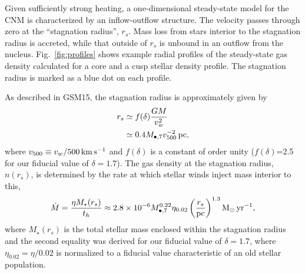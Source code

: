 \documentclass[usenatbib,fleqn]{mnras}
\newcommand{\Mbh}[1][]{M_{\bullet#1}}
\newcommand{\Msun}{{\rm M_\odot}}
\newcommand{\rs}{r_s}
\begin{document}
Given sufficiently strong heating, a one-dimensional steady-state
model for the CNM is characterized by an inflow-outflow structure.
The velocity passes through zero at the ``stagnation radius'', $\rs$.
Mass loss from stars interior to the stagnation radius is accreted,
while that outside of $\rs$ is unbound in an outflow from the nucleus.
Fig.~\ref{fig:profiles} shows example radial profiles of the
steady-state gas density calculated for a core and a cusp stellar
density profile. The stagnation radius is marked as a blue dot on each
profile.

As described in GSM15, the stagnation radius is approximately given by
\begin{align}
r_s &\simeq f(\delta) \frac{G M}{v_w^2}\\
 &\simeq 0.4 \Mbh[,7] v_{500}^{-2} \,{\rm pc},
\label{eq:rs}
\end{align}
%
where $v_{500}\equiv v_w/500 \,{\rm km\, s^{-1}}$ and $f(\delta)$ is a
constant of order unity ($f(\delta)$=2.5 for our fiducial value of
$\delta=1.7$).  The gas density at the stagnation radius, $n(\rs)$, is
determined by the rate at which stellar winds inject mass interior to
this,
\begin{equation}
  \dot{M}=\frac{\eta M_{\rm \star}(\rs)}{t_h} \approx  2.8 \times 10^{-6} \Mbh[,7]^{0.22} \eta_{0.02} \left(\frac{r_s}{\rm
      pc}\right)^{1.3} \Msun \, {\rm yr}^{-1},
\label{eq:dotM}
\end{equation}
%
where $M_{\star}(\rs)$ is the total stellar mass enclosed within the
stagnation radius and the second equality was derived for our fiducial
value of $\delta=1.7$, where $\eta_{0.02}=\eta/0.02$ is normalized to
a fiducial value characteristic of an old stellar population.
\end{document}
